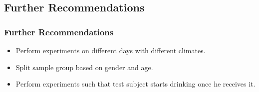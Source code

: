 \documentclass[compress,handout,10pt]{beamer}
\let\olditem\item
\renewcommand{\item}{\setlength{\itemsep}{0.5\baselineskip}\olditem}
\begin{document}
\subsection{Further Recommendations}
\begin{frame}
    \frametitle{Further Recommendations}
\begin{itemize}
\item Perform experiments on different days with different climates.
\item Split sample group based on gender and age.
\item Perform experiments such that test subject starts drinking once he receives it.
\end{itemize}
\end{frame}
\end{document}
